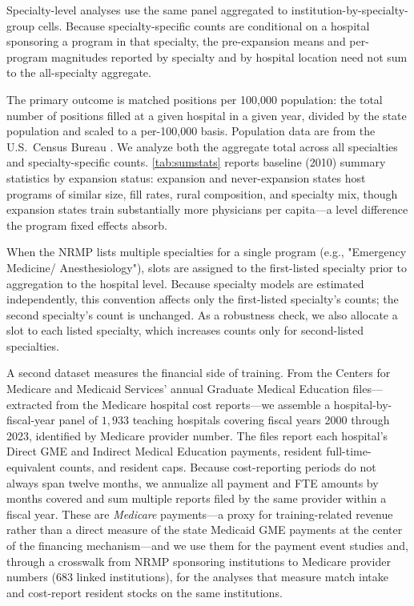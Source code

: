 Specialty-level analyses use the same panel aggregated to institution-by-specialty-group cells. Because specialty-specific counts are conditional on a hospital sponsoring a program in that specialty, the pre-expansion means and per-program magnitudes reported by specialty and by hospital location need not sum to the all-specialty aggregate.

The primary outcome is matched positions per 100,000 population: the total number of positions filled at a given hospital in a given year, divided by the state population and scaled to a per-100,000 basis. Population data are from the U.S.\ Census Bureau \autocite{census_2000, acs_1yr_2019}. We analyze both the aggregate total across all specialties and specialty-specific counts. \cref{tab:sumstats} reports baseline (2010) summary statistics by expansion status: expansion and never-expansion states host programs of similar size, fill rates, rural composition, and specialty mix, though expansion states train substantially more physicians per capita---a level difference the program fixed effects absorb.

When the NRMP lists multiple specialties for a single program (e.g., "Emergency Medicine/ Anesthesiology"), slots are assigned to the first-listed specialty prior to aggregation to the hospital level. Because specialty models are estimated independently, this convention affects only the first-listed specialty's counts; the second specialty's count is unchanged. As a robustness check, we also allocate a slot to each listed specialty, which increases counts only for second-listed specialties.

A second dataset measures the financial side of training. From the Centers for Medicare and Medicaid Services' annual Graduate Medical Education files---extracted from the Medicare hospital cost reports---we assemble a hospital-by-fiscal-year panel of $1{,}933$ teaching hospitals covering fiscal years 2000 through 2023, identified by Medicare provider number. The files report each hospital's Direct GME and Indirect Medical Education payments, resident full-time-equivalent counts, and resident caps. Because cost-reporting periods do not always span twelve months, we annualize all payment and FTE amounts by months covered and sum multiple reports filed by the same provider within a fiscal year. These are \emph{Medicare} payments---a proxy for training-related revenue rather than a direct measure of the state Medicaid GME payments at the center of the financing mechanism---and we use them for the payment event studies and, through a crosswalk from NRMP sponsoring institutions to Medicare provider numbers ($683$ linked institutions), for the analyses that measure match intake and cost-report resident stocks on the same institutions.

